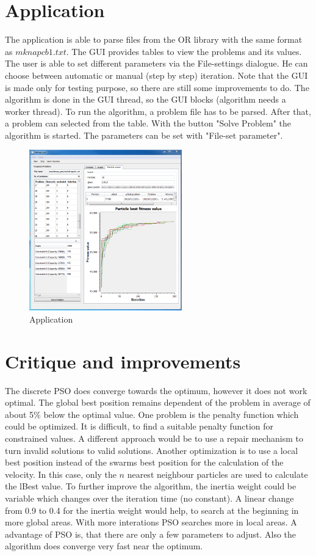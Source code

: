 \documentclass{article}
\begin{document}
\section{Application}
\label{lbl-app}
The application is able to parse files from the OR library with the same format as $mknapcb1.txt$. The GUI   provides tables to view the problems and its values. The user is able to set different parameters via the File-settings dialogue. He can choose between automatic or manual (step by step) iteration. Note that the GUI is made only for testing purpose, so there are still some improvements to do. The algorithm is done in the GUI thread, so the GUI blocks (algorithm needs a worker thread). To run the algorithm, a problem file has to be parsed. After that, a problem can selected from the table. With the button "Solve Problem" the algorithm is started. The parameters can be set with "File-set parameter".

\begin{figure}[H]
    \centering
    \includegraphics[width=250px]{images/image_main.PNG}
    \caption{Application}
    \label{fig-app}
\end{figure}

\section{Critique and improvements}
\label{lbl-impr}
The discrete PSO does converge towards the optimum, however it does not work optimal. The global best position remains dependent of the problem in average of about 5\% below the optimal value. One problem is the penalty function which could be optimized. It is difficult, to find a suitable penalty function for constrained values. A different approach would be to use a repair mechanism to turn invalid solutions to valid solutions. Another optimization is to use a local best position instead of the swarms best position for the calculation of the velocity. In this case, only the $n$ nearest neighbour particles are used to calculate the lBest value. To further improve the algorithm, the inertia weight could be variable which changes over the iteration time (no constant). A linear change from 0.9 to 0.4 for the inertia weight would help, to search at the beginning in more global areas. With more interations PSO searches more in local areas. A advantage of PSO is, that there are only a few parameters to adjust. Also the algorithm does converge very fast near the optimum.
\end{document}
